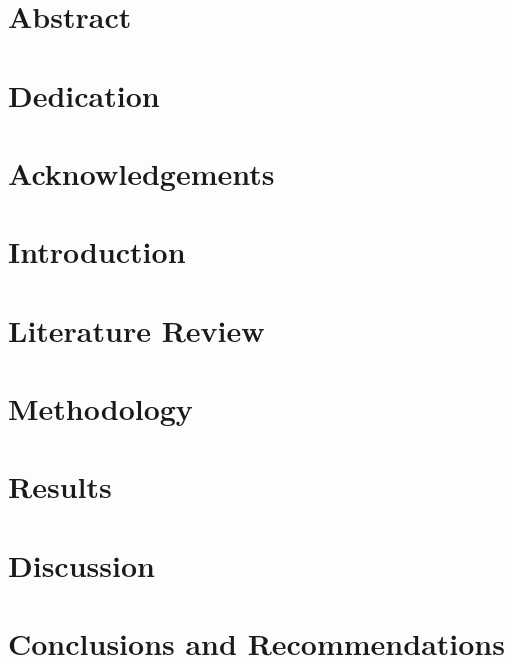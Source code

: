 \documentclass[12pt]{report}
\begin{document}
\chapter*{Abstract}


\chapter*{Dedication}




\chapter*{Acknowledgements}


\chapter{Introduction}
\label{ch:chapter-01}


\chapter{Literature Review}
\label{ch:chapter-02}


\chapter{Methodology}
\label{ch:chapter-03}


\chapter{Results}
\label{ch:chapter-04}


\chapter{Discussion}
\label{ch:chapter-05}


\chapter{Conclusions and Recommendations}
\label{ch:chapter-06}




\appendix
{}
\begin{appendices}

\end{appendices}
\end{document}
